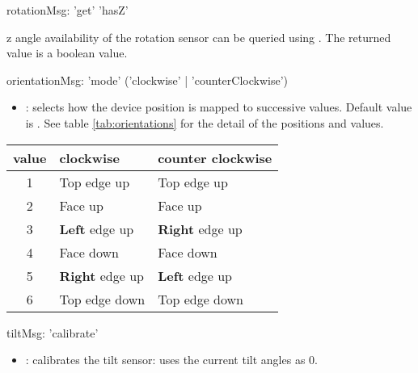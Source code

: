\begin{rail}
rotationMsg: 	'get' 'hasZ'
\end{rail}

z angle availability of the rotation sensor can be queried using . The returned value is a boolean value.

\label{orientmsg}

\begin{rail}
orientationMsg: 	'mode' ('clockwise' | 'counterClockwise')
\end{rail}

\begin{itemize}
\item {}: selects how the device position is mapped to successive values. Default value is . See table \ref{tab:orientations} for the detail of the positions and values. 
\end{itemize}

\begin{table*}[htbp]
\begin{center}
\begin{tabular}{cll}
\hline
value & clockwise	&	counter clockwise \\
\hline
1	& Top edge up	& Top edge up	\\
2	& Face up		& Face up		\\
3	& \textbf{Left} edge up	& \textbf{Right} edge up	\\
4	& Face down		& Face down		\\
5	& \textbf{Right} edge up & \textbf{Left} edge up 	\\
6	& Top edge down & Top edge down \\
\hline
\end{tabular}
\end{center}
\label{tab:orientations}
\caption{Device positions and values in different modes.}
\end{table*}




\begin{rail}
tiltMsg: 	'calibrate'
\end{rail}

\begin{itemize}
\item {}: calibrates the tilt sensor: uses the current tilt angles as 0. 
\end{itemize}

